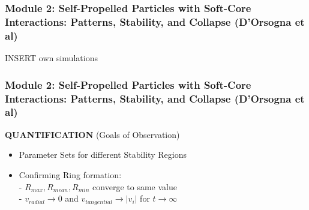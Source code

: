 \documentclass[compress]{beamer}
\begin{document}
\begin{frame}
  \frametitle{Module 2: Self-Propelled Particles with Soft-Core Interactions: Patterns, Stability, and Collapse (D'Orsogna et al)}
	
	
	INSERT own simulations 
%	
	
\end{frame}

%	
%	
%	
%


%	
%	
%


\begin{frame}
  \frametitle{Module 2: Self-Propelled Particles with Soft-Core Interactions: Patterns, Stability, and Collapse (D'Orsogna et al)}
	
	\textbf{QUANTIFICATION} \small (Goals of Observation) \normalsize
	
	\begin{itemize}
		\item Parameter Sets for different Stability Regions
		\item Confirming Ring formation: \\
			- \( R_{max}, R_{mean}, R_{min} \) converge to same value \\
			- \( v_{radial} \to 0 \) and \( v_{tangential} \to | v_{i} |  \) for \( t \to \infty \)
	\end{itemize}
\end{frame}
\end{document}
